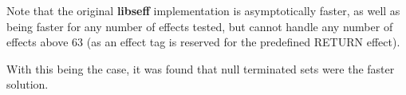 \documentclass[logo,bsc,singlespacing,parskip,online]{infthesis}
\begin{document}
Note that the original \textbf{libseff} implementation is asymptotically faster, as well as being faster for any number of effects tested, but cannot handle any number of effects above 63 (as an effect tag is reserved for the predefined RETURN effect).

With this being the case, it was found that null terminated sets were the faster solution.

\end{document}
